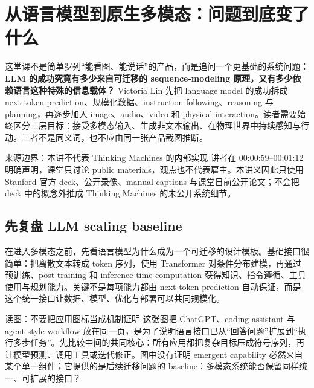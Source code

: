 \section{从语言模型到原生多模态：问题到底变了什么}

这堂课不是简单罗列“能看图、能说话”的产品，而是追问一个更基础的系统问题：\textbf{LLM 的成功究竟有多少来自可迁移的 sequence-modeling 原理，又有多少依赖语言这种特殊的信息载体？} Victoria Lin 先把 language model 的成功拆成 next-token prediction、规模化数据、instruction following、reasoning 与 planning，再逐步加入 image、audio、video 和 physical interaction。读者需要始终区分三层目标：接受多模态输入、生成非文本输出、在物理世界中持续感知与行动。三者不是同义词，也不应由同一张产品截图推断。

\begin{warningbox}{来源边界：本讲不代表 Thinking Machines 的内部实现}
讲者在 00:00:59--00:01:12 明确声明，课堂只讨论 public materials，观点也不代表雇主。本讲义因此只使用 Stanford 官方 deck、公开录像、manual captions 与课堂日前公开论文；不会把 deck 中的概念外推成 Thinking Machines 的未公开系统细节。
\end{warningbox}

\subsection{先复盘 LLM scaling baseline}

在进入多模态之前，先看语言模型为什么成为一个可迁移的设计模板。基础接口很简单：把离散文本转成 token 序列，使用 Transformer 对条件分布建模，再通过预训练、post-training 和 inference-time computation 获得知识、指令遵循、工具使用与规划能力。关键不是每项能力都由 next-token prediction 自动保证，而是这个统一接口让数据、模型、优化与部署可以共同规模化。


\begin{knowledgebox}{读图：不要把应用图标当成机制证明}
这张图把 ChatGPT、coding assistant 与 agent-style workflow 放在同一页，是为了说明语言接口已从“回答问题”扩展到“执行多步任务”。先比较中间的共同核心：所有应用都把复杂目标压成符号序列，再让模型预测、调用工具或迭代修正。图中没有证明 emergent capability 必然来自某个单一组件；它提供的是后续迁移问题的 baseline：多模态系统能否保留同样统一、可扩展的接口？
\end{knowledgebox}


